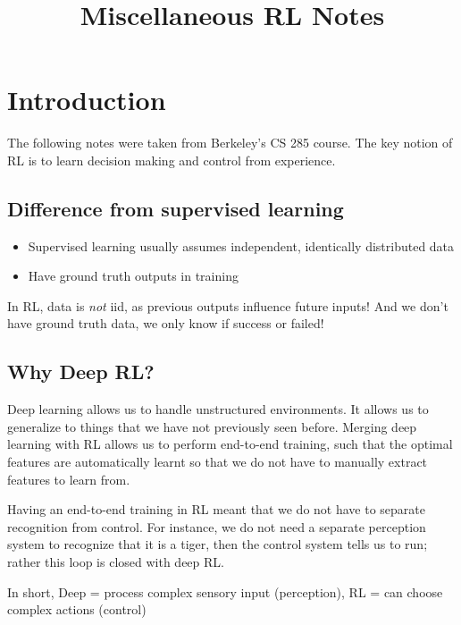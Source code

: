 \documentclass[11pt]{article} %
\title{Miscellaneous RL Notes}
\author{}
\date{}
\begin{document}
\maketitle

\tableofcontents

\newpage

\section{Introduction}
The following notes were taken from Berkeley's CS 285 course. The key notion of RL is to learn decision making and control from experience.

\subsection{Difference from supervised learning}
\begin{itemize}
    \item Supervised learning usually assumes independent, identically distributed data
    \item Have ground truth outputs in training
\end{itemize}
In RL, data is \emph{not} iid, as previous outputs influence future inputs! And we don't have ground truth data, we only know if success or failed!

\subsection{Why Deep RL?}
Deep learning allows us to handle unstructured environments. It allows us to generalize to things that we have not previously seen before. Merging deep learning with RL allows us to perform end-to-end training, such that the optimal features are automatically learnt so that we do not have to manually extract features to learn from.

Having an end-to-end training in RL meant that we do not have to separate recognition from control. For instance, we do not need a separate perception system to recognize that it is a tiger, then the control system tells us to run; rather this loop is closed with deep RL.

In short, Deep = process complex sensory input (perception), RL = can choose complex actions (control)
\end{document}
